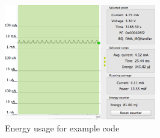 \begin{figure}[H]
    \centering
    \includegraphics[width=250px]{figures/sw/preamp.png}
    \caption{Energy usage for example code}
    \label{fig:preamp}
\end{figure}
